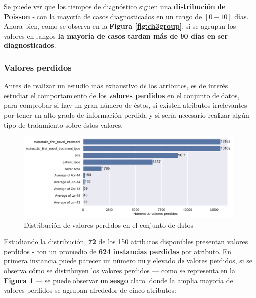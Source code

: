 Se puede ver que los tiempos de diagnóstico siguen una \textbf{distribución de Poisson} - con la mayoría de casos diagnosticados en un rango de $[0-10]$ días. Ahora bien, como se observa en la \textbf{Figura \ref{fig:ch3group}}, si se agrupan los valores en rangos \textbf{la mayoría de casos tardan más de 90 días en ser diagnosticados}.

\subsubsection{Valores perdidos}

Antes de realizar un estudio más exhaustivo de los atributos, es de interés estudiar el comportamiento de los \textbf{valores perdidos} en el conjunto de datos, para comprobar si hay un gran número de éstos, si existen atributos irrelevantes por tener un alto grado de información perdida y si sería necesario realizar algún tipo de tratamiento sobre éstos valores.

\begin{figure}[h]
	\centering
	\includegraphics[width=\linewidth]{figs/chapter3/missingvalues}
	\captionsetup{belowskip=-15pt}
	\caption{Distribución de valores perdidos en el conjunto de datos}
	\label{fig:ch3missingvalues}
\end{figure}

Estudiando la distribución, \textbf{72} de los 150 atributos disponibles presentan valores perdidos - con un promedio de \textbf{624 instancias perdidas} por atributo. En primera instancia puede parecer un número muy elevado de valores perdidos, si se observa cómo se distribuyen los valores perdidos --- como se representa en la \textbf{Figura \ref{fig:ch3missingvalues}} --- se puede observar un \textbf{sesgo} claro, donde la amplia mayoría de valores perdidos se agrupan alrededor de cinco atributos:

